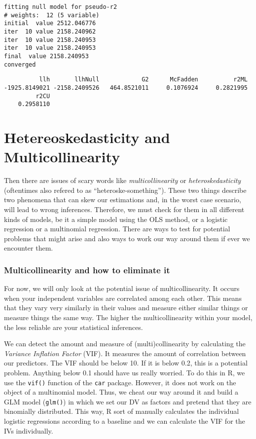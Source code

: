 \documentclass[
  letterpaper,
  DIV=11,
  numbers=noendperiod]{scrreprt}
\begin{document}
\begin{verbatim}
fitting null model for pseudo-r2
# weights:  12 (5 variable)
initial  value 2512.046776 
iter  10 value 2158.240962
iter  10 value 2158.240953
iter  10 value 2158.240953
final  value 2158.240953 
converged
\end{verbatim}

\begin{verbatim}
          llh       llhNull            G2      McFadden          r2ML 
-1925.8149021 -2158.2409526   464.8521011     0.1076924     0.2821995 
         r2CU 
    0.2958110 
\end{verbatim}

\hypertarget{hetereoskedasticity-and-multicollinearity}{%
\chapter{Hetereoskedasticity and
Multicollinearity}\label{hetereoskedasticity-and-multicollinearity}}

Then there are issues of scary words like \emph{multicollinearity} or
\emph{heteroskedasticity} (oftentimes also refered to as
``heteroske-something''). These two things describe two phenomena that
can skew our estimations and, in the worst case scenario, will lead to
wrong inferences. Therefore, we must check for them in all different
kinds of models, be it a simple model using the OLS method, or a
logistic regression or a multinomial regression. There are ways to test
for potential problems that might arise and also ways to work our way
around them if ever we encounter them.

\hypertarget{multicollinearity-and-how-to-eliminate-it}{%
\subsection{Multicollinearity and how to eliminate
it}\label{multicollinearity-and-how-to-eliminate-it}}

For now, we will only look at the potential issue of multicollinearity.
It occurs when your independent variables are correlated among each
other. This means that they vary very similarly in their values and
measure either similar things or measure things the same way. The higher
the multicollinearity within your model, the less reliable are your
statistical inferences.

We can detect the amount and measure of (multi)collinearity by
calculating the \emph{Variance Inflation Factor} (VIF). It measures the
amount of correlation between our predictors. The VIF should be below
10. If it is below 0.2, this is a potential problem. Anything below 0.1
should have us really worried. To do this in R, we use the
\texttt{vif()} function of the \texttt{car} package. However, it does
not work on the object of a multinomial model. Thus, we cheat our way
around it and build a GLM model (\texttt{glm()}) in which we set our DV
as factors and pretend that they are binomially distributed. This way, R
sort of manually calculates the individual logistic regressions
according to a baseline and we can calculate the VIF for the IVs
individually.
\end{document}

